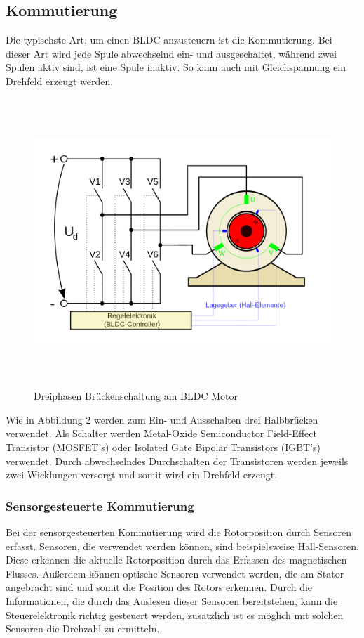 \subsection{Kommutierung}
Die typischste Art, um einen BLDC anzusteuern ist die Kommutierung. Bei dieser Art wird jede Spule abwechselnd ein- und ausgeschaltet, während zwei Spulen aktiv sind, ist eine Spule inaktiv. So kann auch mit Gleichspannung ein Drehfeld erzeugt werden. 
\begin{figure}[h]
    \begin{center}
        \includegraphics[width=15.35cm, height= 10.85cm]{images/Abbildung 2.png}
        \caption{Dreiphasen Brückenschaltung am BLDC Motor 
        \cite{wiki:BLDC}}
        \label{BrückenschaltungBLDC}
        \end{center}
\end{figure}
Wie in Abbildung 2 werden zum Ein- und Ausschalten drei Halbbrücken verwendet. Als Schalter werden Metal-Oxide Semiconductor Field-Effect Transistor (MOSFET’s) oder Isolated Gate Bipolar Transistors (IGBT’s) verwendet. Durch abwechselndes Durchschalten der Transistoren werden jeweils zwei Wicklungen versorgt und somit wird ein Drehfeld erzeugt. 
\cite{wiki:BLDC}
\cite{sflix:Kommutierung}
\subsubsection{Sensorgesteuerte Kommutierung}
Bei der sensorgesteuerten Kommutierung wird die Rotorposition durch Sensoren erfasst. Sensoren, die verwendet werden können, sind beispielsweise Hall-Sensoren. Diese erkennen die aktuelle Rotorposition durch das Erfassen des magnetischen Flusses. Au{\ss}erdem können optische Sensoren verwendet werden, die am Stator angebracht sind und somit die Position des Rotors erkennen.  Durch die Informationen, die durch das Auslesen dieser Sensoren bereitstehen, kann die Steuerelektronik richtig gesteuert werden, zusätzlich ist es möglich mit solchen Sensoren die Drehzahl zu ermitteln. 
\cite{wiki:BLDC}
\cite{sflix:Kommutierung}
\clearpage

